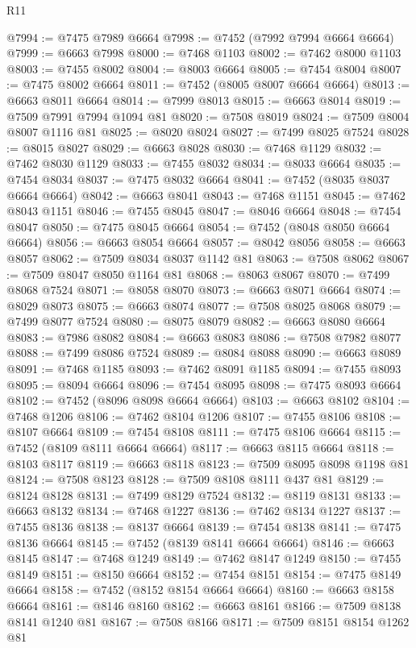 \begin{lexlean}{R11}
\begin{coremodule}
@7994 := @7475 @7989 @6664
@7998 := @7452 (@7992 @7994 @6664 @6664)
@7999 := @6663 @7998
@8000 := @7468 @1103
@8002 := @7462 @8000 @1103
@8003 := @7455 @8002
@8004 := @8003 @6664
@8005 := @7454 @8004
@8007 := @7475 @8002 @6664
@8011 := @7452 (@8005 @8007 @6664 @6664)
@8013 := @6663 @8011 @6664
@8014 := @7999 @8013
@8015 := @6663 @8014
@8019 := @7509 @7991 @7994 @1094 @81
@8020 := @7508 @8019
@8024 := @7509 @8004 @8007 @1116 @81
@8025 := @8020 @8024
@8027 := @7499 @8025 @7524
@8028 := @8015 @8027
@8029 := @6663 @8028
@8030 := @7468 @1129
@8032 := @7462 @8030 @1129
@8033 := @7455 @8032
@8034 := @8033 @6664
@8035 := @7454 @8034
@8037 := @7475 @8032 @6664
@8041 := @7452 (@8035 @8037 @6664 @6664)
@8042 := @6663 @8041
@8043 := @7468 @1151
@8045 := @7462 @8043 @1151
@8046 := @7455 @8045
@8047 := @8046 @6664
@8048 := @7454 @8047
@8050 := @7475 @8045 @6664
@8054 := @7452 (@8048 @8050 @6664 @6664)
@8056 := @6663 @8054 @6664
@8057 := @8042 @8056
@8058 := @6663 @8057
@8062 := @7509 @8034 @8037 @1142 @81
@8063 := @7508 @8062
@8067 := @7509 @8047 @8050 @1164 @81
@8068 := @8063 @8067
@8070 := @7499 @8068 @7524
@8071 := @8058 @8070
@8073 := @6663 @8071 @6664
@8074 := @8029 @8073
@8075 := @6663 @8074
@8077 := @7508 @8025 @8068
@8079 := @7499 @8077 @7524
@8080 := @8075 @8079
@8082 := @6663 @8080 @6664
@8083 := @7986 @8082
@8084 := @6663 @8083
@8086 := @7508 @7982 @8077
@8088 := @7499 @8086 @7524
@8089 := @8084 @8088
@8090 := @6663 @8089
@8091 := @7468 @1185
@8093 := @7462 @8091 @1185
@8094 := @7455 @8093
@8095 := @8094 @6664
@8096 := @7454 @8095
@8098 := @7475 @8093 @6664
@8102 := @7452 (@8096 @8098 @6664 @6664)
@8103 := @6663 @8102
@8104 := @7468 @1206
@8106 := @7462 @8104 @1206
@8107 := @7455 @8106
@8108 := @8107 @6664
@8109 := @7454 @8108
@8111 := @7475 @8106 @6664
@8115 := @7452 (@8109 @8111 @6664 @6664)
@8117 := @6663 @8115 @6664
@8118 := @8103 @8117
@8119 := @6663 @8118
@8123 := @7509 @8095 @8098 @1198 @81
@8124 := @7508 @8123
@8128 := @7509 @8108 @8111 @437 @81
@8129 := @8124 @8128
@8131 := @7499 @8129 @7524
@8132 := @8119 @8131
@8133 := @6663 @8132
@8134 := @7468 @1227
@8136 := @7462 @8134 @1227
@8137 := @7455 @8136
@8138 := @8137 @6664
@8139 := @7454 @8138
@8141 := @7475 @8136 @6664
@8145 := @7452 (@8139 @8141 @6664 @6664)
@8146 := @6663 @8145
@8147 := @7468 @1249
@8149 := @7462 @8147 @1249
@8150 := @7455 @8149
@8151 := @8150 @6664
@8152 := @7454 @8151
@8154 := @7475 @8149 @6664
@8158 := @7452 (@8152 @8154 @6664 @6664)
@8160 := @6663 @8158 @6664
@8161 := @8146 @8160
@8162 := @6663 @8161
@8166 := @7509 @8138 @8141 @1240 @81
@8167 := @7508 @8166
@8171 := @7509 @8151 @8154 @1262 @81

\end{coremodule}
\end{lexlean}
